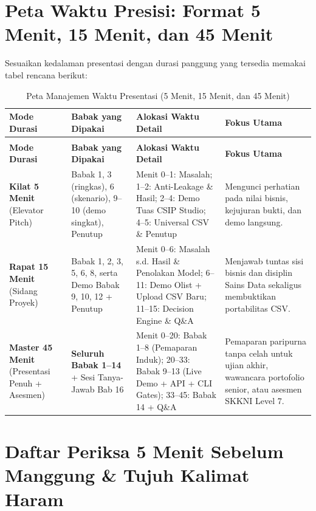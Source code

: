 \documentclass[11pt,a4paper,oneside]{book}
\begin{document}
\section{Peta Waktu Presisi: Format 5 Menit, 15 Menit, dan 45 Menit}

Sesuaikan kedalaman presentasi dengan durasi panggung yang tersedia memakai tabel rencana berikut:

\begin{longtable}{@{} >{\raggedright\arraybackslash}p{2.4cm} >{\raggedright\arraybackslash}p{4.4cm} >{\raggedright\arraybackslash}p{4.4cm} >{\raggedright\arraybackslash}p{4.2cm} @{}}
\caption{Peta Manajemen Waktu Presentasi (5 Menit, 15 Menit, dan 45 Menit)} \\
\toprule
\textbf{Mode Durasi} & \textbf{Babak yang Dipakai} & \textbf{Alokasi Waktu Detail} & \textbf{Fokus Utama} \\
\midrule
\endfirsthead
\multicolumn{1}{@{}l}{\small\emph{(Tabel lanjutan)}} \\
\toprule
\textbf{Mode Durasi} & \textbf{Babak yang Dipakai} & \textbf{Alokasi Waktu Detail} & \textbf{Fokus Utama} \\
\midrule
\endhead
\bottomrule
\endfoot
\textbf{Kilat 5 Menit} (Elevator Pitch) & Babak 1, 3 (ringkas), 6 (skenario), 9--10 (demo singkat), Penutup & Menit 0--1: Masalah; 1--2: Anti-Leakage \& Hasil; 2--4: Demo Tuas CSIP Studio; 4--5: Universal CSV \& Penutup & Mengunci perhatian pada nilai bisnis, kejujuran bukti, dan demo langsung. \\
\textbf{Rapat 15 Menit} (Sidang Proyek) & Babak 1, 2, 3, 5, 6, 8, serta Demo Babak 9, 10, 12 + Penutup & Menit 0--6: Masalah s.d. Hasil \& Penolakan Model; 6--11: Demo Olist + Upload CSV Baru; 11--15: Decision Engine \& Q\&A & Menjawab tuntas sisi bisnis dan disiplin Sains Data sekaligus membuktikan portabilitas CSV. \\
\textbf{Master 45 Menit} (Presentasi Penuh + Asesmen) & \textbf{Seluruh Babak 1--14} + Sesi Tanya-Jawab Bab 16 & Menit 0--20: Babak 1--8 (Pemaparan Induk); 20--33: Babak 9--13 (Live Demo + API + CLI Gates); 33--45: Babak 14 + Q\&A & Pemaparan paripurna tanpa celah untuk ujian akhir, wawancara portofolio senior, atau asesmen SKKNI Level 7. \\
\end{longtable}

\section{Daftar Periksa 5 Menit Sebelum Manggung \& Tujuh Kalimat Haram}
\end{document}
